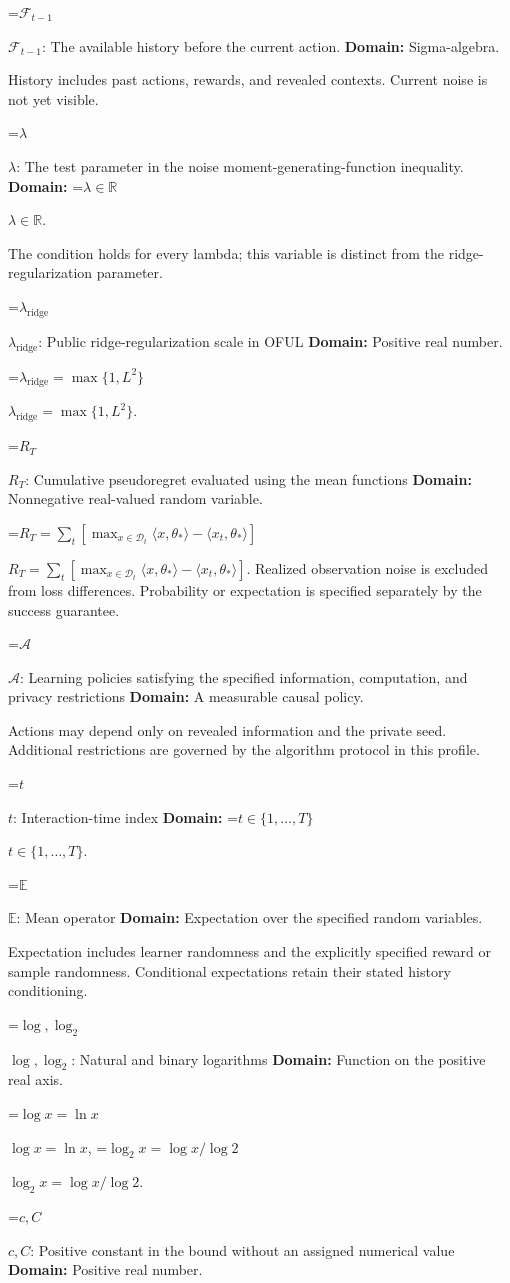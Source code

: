 \documentclass[10pt,a4paper]{article}
\newcommand{\AtlasMath}[1]{\par\begingroup\centering\setbox0=\hbox{$\displaystyle #1$}\ifdim\wd0>1.4\linewidth\typeout{ATLAS WIDE FORMULA: \the\wd0}\fi\ifdim\wd0>\linewidth\resizebox{\linewidth}{!}{\box0}\else\box0\fi\par\endgroup}
\newcommand{\AtlasInlineMath}[1]{\begingroup\setbox0=\hbox{$#1$}\ifdim\wd0>.4\linewidth\endgroup\AtlasMath{#1}\else\endgroup$#1$\fi}
\begin{document}
\AtlasInlineMath{\mathcal F_{t-1}}: The available history before the current action. \textbf{Domain:} Sigma-algebra.

History includes past actions, rewards, and revealed contexts. Current noise is not yet visible.

\AtlasInlineMath{\lambda}: The test parameter in the noise moment-generating-function inequality. \textbf{Domain:} \AtlasInlineMath{\lambda\in\mathbb R}.

The condition holds for every lambda; this variable is distinct from the ridge-regularization parameter.

\AtlasInlineMath{\lambda_{\mathrm{ridge}}}: Public ridge-regularization scale in OFUL \textbf{Domain:} Positive real number.

\AtlasInlineMath{\lambda_{\mathrm{ridge}}=\max\{1,L^2\}}.

\AtlasInlineMath{R_T}: Cumulative pseudoregret evaluated using the mean functions \textbf{Domain:} Nonnegative real-valued random variable.

\AtlasInlineMath{R_T=\sum_t[\max_{x\in\mathcal D_t}\langle x,\theta_*\rangle-\langle x_t,\theta_*\rangle]}. Realized observation noise is excluded from loss differences. Probability or expectation is specified separately by the success guarantee.

\AtlasInlineMath{\mathcal A}: Learning policies satisfying the specified information, computation, and privacy restrictions \textbf{Domain:} A measurable causal policy.

Actions may depend only on revealed information and the private seed. Additional restrictions are governed by the algorithm protocol in this profile.

\AtlasInlineMath{t}: Interaction-time index \textbf{Domain:} \AtlasInlineMath{t\in\{1,\ldots,T\}}.

\AtlasInlineMath{\mathbb E}: Mean operator \textbf{Domain:} Expectation over the specified random variables.

Expectation includes learner randomness and the explicitly specified reward or sample randomness. Conditional expectations retain their stated history conditioning.

\AtlasInlineMath{\log,\log_2}: Natural and binary logarithms \textbf{Domain:} Function on the positive real axis.

\AtlasInlineMath{\log x=\ln x}, \AtlasInlineMath{\log_2x=\log x/\log2}.

\AtlasInlineMath{c,C}: Positive constant in the bound without an assigned numerical value \textbf{Domain:} Positive real number.
\end{document}
